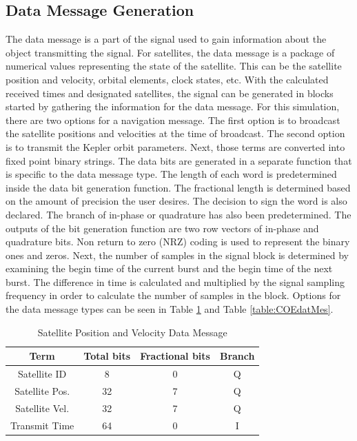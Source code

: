 \documentclass[12pt]{report}
\begin{document}
\subsection{Data Message Generation}
The data message is a part of the signal used to gain information about the object transmitting the signal. For satellites, the data message is a package of numerical values representing the state of the satellite. This can be the satellite position and velocity, orbital elements, clock states, etc. With the calculated received times and designated satellites, the signal can be generated in blocks started by gathering the information for the data message. For this simulation, there are two options for a navigation message. The first option is to broadcast the satellite positions and velocities at the time of broadcast. The second option is to transmit the Kepler orbit parameters. Next, those terms are converted into fixed point binary strings. The data bits are generated in a separate function that is specific to the data message type. The length of each word is predetermined inside the data bit generation function.  The fractional length is determined based on the amount of precision the user desires. The decision to sign the word is also declared. The branch of in-phase or quadrature has also been predetermined. The outputs of the bit generation function are two row vectors of in-phase and quadrature bits. Non return to zero (NRZ) coding is used to represent the binary ones and zeros. Next, the number of samples in the signal block is determined by examining the begin time of the current burst and the begin time of the next burst. The difference in time is calculated and multiplied by the signal sampling frequency in order to calculate the number of samples in the block. Options for the data message types can be seen in Table \ref{table:SVPosDataMes} and Table \ref{table:COEdatMes}.

\begin{table}
\begin{center}
\begin{tabular}{|c|c|c|c|}
    \hline
    Term & Total bits & Fractional bits & Branch \\
    \hline
    Satellite ID & 8 & 0 & Q \\
    \hline
    Satellite Pos. & 32 & 7 & Q \\
    \hline
    Satellite Vel. & 32 & 7 & Q \\
    \hline
    Transmit Time & 64 & 0 & I \\
    \hline
\end{tabular}
\caption{Satellite Position and Velocity Data Message}
\label{table:SVPosDataMes}
\end{center}
\end{table}
\end{document}
